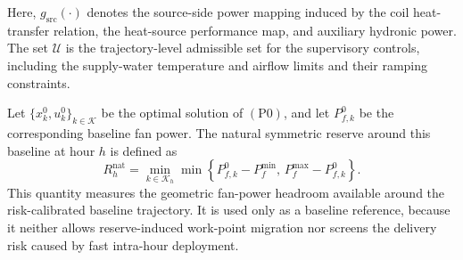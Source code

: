 \documentclass[journal]{IEEEtran}
\theoremstyle{remark}
\begin{document}
	Here, \(g_{\mathrm{src}}(\cdot)\) denotes the source-side power mapping
	induced by the coil heat-transfer relation, the heat-source performance
	map, and auxiliary hydronic power. The set \(\mathcal{U}\) is the
	trajectory-level admissible set for the supervisory controls, including
	the supply-water temperature and airflow limits and their ramping
	constraints.
	
	Let \(\{x_k^0,u_k^0\}_{k\in\mathcal{K}}\) be the optimal solution of
	\((\mathrm{P0})\), and let \(P_{f,k}^0\) be the corresponding baseline
	fan power. The natural symmetric reserve around this baseline at hour
	\(h\) is defined as
	\begin{equation}
		R_h^{\mathrm{nat}}
		=
		\min_{k\in\mathcal{K}_h}
		\min
		\left\{
		P_{f,k}^{0}-P_f^{\min},
		\,
		P_f^{\max}-P_{f,k}^{0}
		\right\}.
		\label{eq:natural_reserve}
	\end{equation}
	This quantity measures the geometric fan-power headroom available
	around the risk-calibrated baseline trajectory. It is used only as a
	baseline reference, because it neither allows reserve-induced
	work-point migration nor screens the delivery risk caused by fast
	intra-hour deployment.
	
	
	
	
\end{document}
